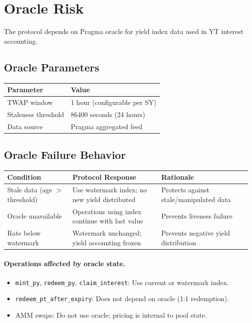 \section{Oracle Risk}

The protocol depends on Pragma oracle for yield index data used in YT interest accounting.

\subsection{Oracle Parameters}

\begin{center}
\begin{tabular}{ll}
\toprule
\textbf{Parameter} & \textbf{Value} \\
\midrule
TWAP window & 1 hour (configurable per SY) \\
Staleness threshold & 86400 seconds (24 hours) \\
Data source & Pragma aggregated feed \\
\bottomrule
\end{tabular}
\end{center}

\subsection{Oracle Failure Behavior}

\begin{center}
\begin{tabularx}{\textwidth}{l l >{\raggedright\arraybackslash}X}
\toprule
\textbf{Condition} & \textbf{Protocol Response} & \textbf{Rationale} \\
\midrule
Stale data (age $>$ threshold) & Use watermark index; no new yield distributed & Protects against stale/manipulated data \\
Oracle unavailable & Operations using index continue with last value & Prevents liveness failure \\
Rate below watermark & Watermark unchanged; yield accounting frozen & Prevents negative yield distribution \\
\bottomrule
\end{tabularx}
\end{center}

\paragraph{Operations affected by oracle state.}
\begin{itemize}
\item \texttt{mint\_py}, \texttt{redeem\_py}, \texttt{claim\_interest}: Use current or watermark index.
\item \texttt{redeem\_pt\_after\_expiry}: Does not depend on oracle (1:1 redemption).
\item AMM swaps: Do not use oracle; pricing is internal to pool state.
\end{itemize}

